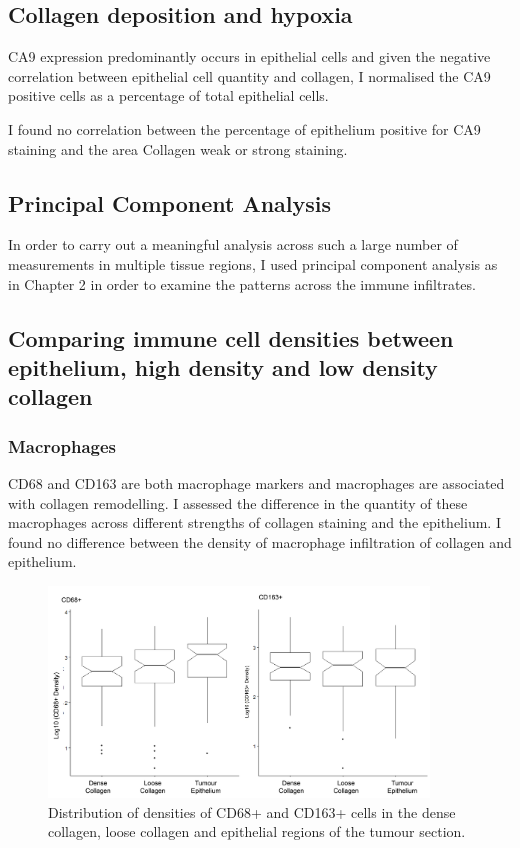 \subsection{Collagen deposition and hypoxia}
CA9 expression predominantly occurs in epithelial cells and given the negative correlation between epithelial cell quantity and collagen,  I normalised the CA9 positive cells as a percentage of total epithelial cells. 

I found no correlation between the percentage of epithelium positive for CA9 staining and the area Collagen weak or strong staining. 



\subsection{Principal Component Analysis}
In order to carry out a meaningful analysis across such a large number of measurements in multiple tissue regions, I used principal component analysis as in Chapter 2 in order to examine the patterns across the immune infiltrates. 

\subsection{Comparing immune cell densities between epithelium, high density and low density collagen}

\subsubsection{Macrophages}

CD68 and CD163 are both macrophage markers and macrophages are associated with collagen remodelling. I assessed the difference in the quantity of these macrophages across different strengths of collagen staining and the epithelium. I found no difference between the density of macrophage infiltration of collagen and epithelium.

\begin{figure}
    \centering
    \includegraphics[width=0.9\textwidth]{Chapter4/figs/Thesis-10.png}
    \caption{Distribution of densities of CD68+ and CD163+ cells in the dense collagen, loose collagen and epithelial regions of the tumour section.}
    \label{fig:distribution}
\end{figure}

